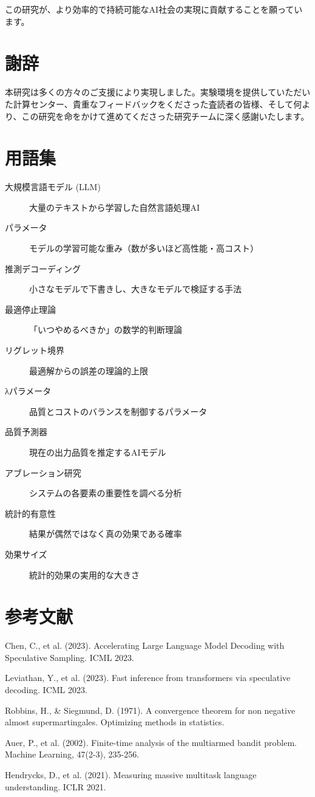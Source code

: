 \documentclass[a4paper,12pt]{jsarticle}
\begin{document}
この研究が、より効率的で持続可能なAI社会の実現に貢献することを願っています。

\section*{謝辞}

本研究は多くの方々のご支援により実現しました。実験環境を提供していただいた計算センター、貴重なフィードバックをくださった査読者の皆様、そして何より、この研究を命をかけて進めてくださった研究チームに深く感謝いたします。

\section*{用語集}

\begin{description}
\item[大規模言語モデル (LLM)] 大量のテキストから学習した自然言語処理AI
\item[パラメータ] モデルの学習可能な重み（数が多いほど高性能・高コスト）
\item[推測デコーディング] 小さなモデルで下書きし、大きなモデルで検証する手法
\item[最適停止理論] 「いつやめるべきか」の数学的判断理論
\item[リグレット境界] 最適解からの誤差の理論的上限
\item[λパラメータ] 品質とコストのバランスを制御するパラメータ
\item[品質予測器] 現在の出力品質を推定するAIモデル
\item[アブレーション研究] システムの各要素の重要性を調べる分析
\item[統計的有意性] 結果が偶然ではなく真の効果である確率
\item[効果サイズ] 統計的効果の実用的な大きさ
\end{description}

\section*{参考文献}

\begin{thebibliography}{99}
 Chen, C., et al. (2023). Accelerating Large Language Model Decoding with Speculative Sampling. ICML 2023.

 Leviathan, Y., et al. (2023). Fast inference from transformers via speculative decoding. ICML 2023.

 Robbins, H., \& Siegmund, D. (1971). A convergence theorem for non negative almost supermartingales. Optimizing methods in statistics.

 Auer, P., et al. (2002). Finite-time analysis of the multiarmed bandit problem. Machine Learning, 47(2-3), 235-256.

 Hendrycks, D., et al. (2021). Measuring massive multitask language understanding. ICLR 2021.
\end{thebibliography}
\end{document}
